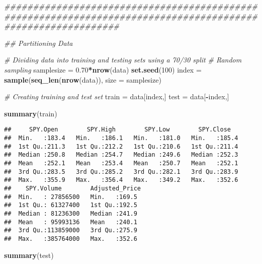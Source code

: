 \documentclass[
]{article}
\newenvironment{Shaded}{\begin{snugshade}}{\end{snugshade}}
\newcommand{\CommentTok}[1]{\textcolor[rgb]{0.56,0.35,0.01}{\textit{#1}}}
\newcommand{\DataTypeTok}[1]{\textcolor[rgb]{0.13,0.29,0.53}{#1}}
\newcommand{\DecValTok}[1]{\textcolor[rgb]{0.00,0.00,0.81}{#1}}
\newcommand{\FloatTok}[1]{\textcolor[rgb]{0.00,0.00,0.81}{#1}}
\newcommand{\KeywordTok}[1]{\textcolor[rgb]{0.13,0.29,0.53}{\textbf{#1}}}
\newcommand{\NormalTok}[1]{#1}
\newcommand{\OperatorTok}[1]{\textcolor[rgb]{0.81,0.36,0.00}{\textbf{#1}}}
\newcommand{\StringTok}[1]{\textcolor[rgb]{0.31,0.60,0.02}{#1}}
\begin{document}
\begin{Shaded}
\begin{Highlighting}[]
\CommentTok{############################################################################################################}

\CommentTok{## Partitioning Data}

  \CommentTok{# Dividing data into training and testing sets using a 70/30 split}
  \CommentTok{# Random sampling }
\NormalTok{    samplesize =}\StringTok{ }\FloatTok{0.70}\OperatorTok{*}\KeywordTok{nrow}\NormalTok{(data)}
    \KeywordTok{set.seed}\NormalTok{(}\DecValTok{100}\NormalTok{)}
\NormalTok{    index =}\StringTok{ }\KeywordTok{sample}\NormalTok{(}\KeywordTok{seq_len}\NormalTok{(}\KeywordTok{nrow}\NormalTok{(data)), }\DataTypeTok{size =}\NormalTok{ samplesize)}
    
  \CommentTok{# Creating training and test set }
\NormalTok{    train =}\StringTok{ }\NormalTok{data[index,]}
\NormalTok{    test =}\StringTok{ }\NormalTok{data[}\OperatorTok{-}\NormalTok{index,]}
    
    \KeywordTok{summary}\NormalTok{(train)}
\end{Highlighting}
\end{Shaded}

\begin{verbatim}
##     SPY.Open        SPY.High        SPY.Low        SPY.Close    
##  Min.   :183.4   Min.   :186.1   Min.   :181.0   Min.   :185.4  
##  1st Qu.:211.3   1st Qu.:212.2   1st Qu.:210.6   1st Qu.:211.4  
##  Median :250.8   Median :254.7   Median :249.6   Median :252.3  
##  Mean   :252.1   Mean   :253.4   Mean   :250.7   Mean   :252.1  
##  3rd Qu.:283.5   3rd Qu.:285.2   3rd Qu.:282.1   3rd Qu.:283.9  
##  Max.   :355.9   Max.   :356.4   Max.   :349.2   Max.   :352.6  
##    SPY.Volume        Adjusted_Price 
##  Min.   : 27856500   Min.   :169.5  
##  1st Qu.: 61327400   1st Qu.:192.5  
##  Median : 81236300   Median :241.9  
##  Mean   : 95993136   Mean   :240.1  
##  3rd Qu.:113859000   3rd Qu.:275.9  
##  Max.   :385764000   Max.   :352.6
\end{verbatim}

\begin{Shaded}
\begin{Highlighting}[]
    \KeywordTok{summary}\NormalTok{(test)}
\end{Highlighting}
\end{Shaded}
\end{document}
